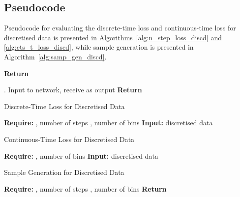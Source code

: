 \documentclass[11pt,table]{article}
\newcommand{\0}[1]{\constvec{0}{#1}}
\newcommand{\1}[1]{\constvec{1}{#1}}
\begin{document}
\subsection{Pseudocode}
Pseudocode for evaluating the discrete-time loss  and continuous-time loss  for discretised data is presented in Algorithms~\ref{alg:n_step_loss_discd} and \ref{alg:cts_t_loss_discd}, while sample generation is presented in Algorithm~\ref{alg:samp_gen_discd}.
\begin{algorithm}[H]
\begin{algorithmic}
\State 
\State 
\State \textbf{Return} 
\EndFunction
\end{algorithmic}
\end{algorithm}
\begin{algorithm}[H]
\begin{algorithmic}
\LineComment{, }
.
\If{}
\State 
\State 
\Else
\State Input  to network, receive  as output
\State 
\State 
\EndIf
\For{, }
\State 
\EndFor
\State \textbf{Return} 
\EndFunction
\end{algorithmic}
\end{algorithm}
\begin{algorithm}[H]
\caption{Discrete-Time Loss  for Discretised Data}\label{alg:n_step_loss_discd}
\begin{algorithmic}
\LineComment{}
\State \textbf{Require:} , number of steps , number of bins 
\State \textbf{Input:} discretised data 
\State 
\State 
\State 
\State 
\State 
\State 
\State 
\State 
\end{algorithmic}
\end{algorithm}
\begin{algorithm}[H]
\caption{Continuous-Time Loss  for Discretised Data}\label{alg:cts_t_loss_discd}
\begin{algorithmic}
\State \textbf{Require:} , number of bins 
\State \textbf{Input:} discretised data 
\State 
\State 
\State 
\State 
\State 
\State 
\end{algorithmic}
\end{algorithm}
\begin{algorithm}[H]
\caption{Sample Generation for Discretised Data}\label{alg:samp_gen_discd}
\begin{algorithmic}
\LineComment{}
\State \textbf{Require:} , number of steps , number of bins 
\State 
\State 
{} 
    \State 
    \State 
    \State 
    \State 
    \State 
    \State 
\EndFor
\State 
\State \textbf{Return} 
\end{algorithmic}
\end{algorithm}
\end{document}
